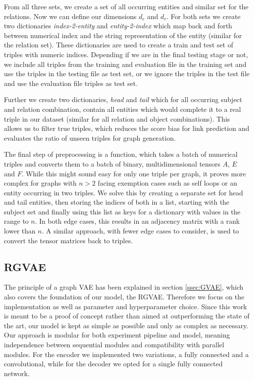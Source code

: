 From all three sets, we create a set of all occurring entities and similar set for the relations. Now we can define our dimensions $d_e$ and $d_r$. For both sets we create two dictionaries \textit{index-2-entity} and \textit{entity-2-index}  which map back and forth between numerical index and the string representation of the entity (similar for the relation set). These dictionaries are used to create a train and test set of triples with numeric indices. Depending if we are in the final testing stage or not, we include all triples from the training and evaluation file in the training set and use the triples in the testing file as test set, or we ignore the triples in the test file and use the evaluation file triples as test set.

Further we create two dictionaries, \textit{head} and \textit{tail} which for all occurring subject and relation combination, contain all entities which would complete it to a real triple in our dataset (similar for all relation and object combinations). This allows us to filter true triples, which reduces the score bias for link prediction and evaluates the ratio of unseen triples for graph generation. 

The final step of preprocessing is a function, which takes a batch of numerical triples and converts them to a batch of binary, multidimensional tensors $A$, $E$ and $F$. While this might sound easy for only one triple per graph, it proves more complex for graphs with $n>2$ facing exemption cases such as self loops or an entity occurring in two triples. We solve this by creating a separate set for head and tail entities, then storing the indices of both in a list, starting with the subject set and finally using this list as keys for a dictionary with values in the range to $n$. In both edge cases, this results in an adjacency matrix with a rank lower than $n$. A similar approach, with fewer edge cases to consider, is used to convert the tensor matrices back to triples.


\subsection{RGVAE}
The principle of a graph VAE has been explained in section \ref{ssec:GVAE}, which also covers the foundation of our model, the RGVAE. Therefore we focus on the implementation as well as parameter and hyperparameter choice. Since this work is meant to be a proof of concept rather than aimed at outperforming the state of the art, our model is kept as simple as possible and only as complex as necessary. Our approach is modular for both experiment pipeline and model, meaning independence between sequential modules and compatibility with parallel modules. For the encoder we implemented two variations, a fully connected and a convolutional, while for the decoder we opted for a single fully connected network.


